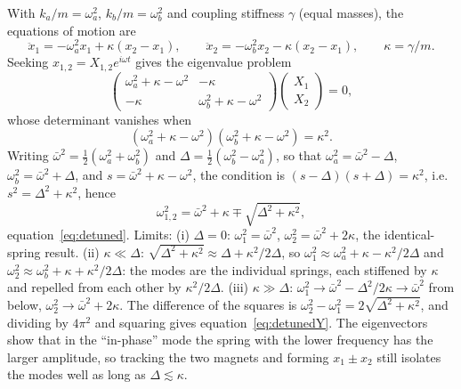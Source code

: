 With $k_a/m=\omega_a^2$, $k_b/m=\omega_b^2$ and coupling stiffness $\gamma$ (equal masses), the equations of motion are
\begin{equation}
\ddot x_1=-\omega_a^2x_1+\kappa(x_2-x_1),\qquad \ddot x_2=-\omega_b^2x_2-\kappa(x_2-x_1),\qquad \kappa=\gamma/m .
\end{equation}
Seeking $x_{1,2}=X_{1,2}e^{i\omega t}$ gives the eigenvalue problem
\begin{equation}
\begin{pmatrix}\omega_a^2+\kappa-\omega^2 & -\kappa\\ -\kappa & \omega_b^2+\kappa-\omega^2\end{pmatrix}
\begin{pmatrix}X_1\\X_2\end{pmatrix}=0 ,
\end{equation}
whose determinant vanishes when
\begin{equation}
(\omega_a^2+\kappa-\omega^2)(\omega_b^2+\kappa-\omega^2)=\kappa^2 .
\end{equation}
Writing $\bar\omega^2=\tfrac12(\omega_a^2+\omega_b^2)$ and $\Delta=\tfrac12(\omega_b^2-\omega_a^2)$, so that $\omega_a^2=\bar\omega^2-\Delta$, $\omega_b^2=\bar\omega^2+\Delta$, and $s=\bar\omega^2+\kappa-\omega^2$, the condition is $(s-\Delta)(s+\Delta)=\kappa^2$, i.e.\ $s^2=\Delta^2+\kappa^2$, hence
\begin{equation}
\omega_{1,2}^2=\bar\omega^2+\kappa\mp\sqrt{\Delta^2+\kappa^2},
\end{equation}
equation~\eqref{eq:detuned}. Limits: (i) $\Delta=0$: $\omega_1^2=\bar\omega^2$, $\omega_2^2=\bar\omega^2+2\kappa$, the identical-spring result. (ii) $\kappa\ll\Delta$: $\sqrt{\Delta^2+\kappa^2}\approx\Delta+\kappa^2/2\Delta$, so $\omega_1^2\approx\omega_a^2+\kappa-\kappa^2/2\Delta$ and $\omega_2^2\approx\omega_b^2+\kappa+\kappa^2/2\Delta$: the modes are the individual springs, each stiffened by $\kappa$ and repelled from each other by $\kappa^2/2\Delta$. (iii) $\kappa\gg\Delta$: $\omega_1^2\to\bar\omega^2-\Delta^2/2\kappa\to\bar\omega^2$ from below, $\omega_2^2\to\bar\omega^2+2\kappa$. The difference of the squares is $\omega_2^2-\omega_1^2=2\sqrt{\Delta^2+\kappa^2}$, and dividing by $4\pi^2$ and squaring gives equation~\eqref{eq:detunedY}. The eigenvectors show that in the ``in-phase'' mode the spring with the lower frequency has the larger amplitude, so tracking the two magnets and forming $x_1\pm x_2$ still isolates the modes well as long as $\Delta\lesssim\kappa$.

